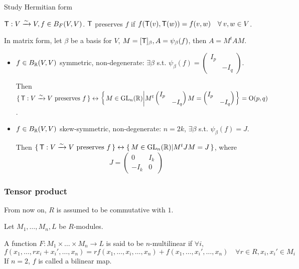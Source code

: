 \begin{exercise}
  Study Hermitian form
\end{exercise}

${\sf T}: V \xrightarrow{\sim} V, f\in B_F(V, V)$.
${\sf T}$ preserves $f$ if $f({\sf T}(v), {\sf T}(w)) = f(v, w) \quad
\forall v,w \in V$.

In matrix form, let $\beta$ be a basis for $V$,
$M =[{\sf T}]_\beta, A = \psi_\beta(f)$, then $A = M^tAM$.

\begin{itemize}
  \item $f \in B_{\mathbb{R}}(V,V)$ symmetric, non-degenerate:
    $\exists \beta$ s.t. $\psi_\beta(f) = \begin{pmatrix}I_p \\ & -I_q\end{pmatrix}$.

    Then $\{\, {\sf T}: V \xrightarrow{\sim} V \text{~preserves~} f \,\} \leftrightarrow
    \left\{\,
      M \in \text{GL}_n(\mathbb{R}) \middle|
      M^t\begin{pmatrix}I_p \\ & -I_q\end{pmatrix}M = \begin{pmatrix}I_p \\ & -I_q\end{pmatrix}
      \,\right\} = \text{O}(p, q)$.
  \item $f \in B_{\mathbb{R}}(V,V)$ skew-symmetric, non-degenerate: $n = 2k$,
    $\exists \beta$ s.t. $\psi_\beta(f) = J$.

    Then $\{\, {\sf T}: V \xrightarrow{\sim} V \text{~preserves~} f \,\} \leftrightarrow
    \left\{\,
      M \in \text{GL}_n(\mathbb{R}) \middle|
      M^tJM = J
      \,\right\}$, where 
    \[ J = \begin{pmatrix}
        0 & I_k \\
        -I_k & 0
    \end{pmatrix} \]
\end{itemize}

\subsubsection{Tensor product}
From now on, $R$ is assumed to be commutative with $1$.

\begin{definition}
Let $M_1, \dots, M_n, L$ be $R$-modules.

A function $F: M_1 \times \dots \times M_n \to L$ is said to be $n$-multilinear
if $\forall i$,
\[
  f(x_1, \dots, rx_i + x_i', \dots, x_n) =
  rf(x_1, \dots, x_i, \dots, x_n) + f(x_1, \dots, x_i', \dots, x_n)
  \quad \forall r \in R, x_i, x_i' \in M_i
\]
If $n = 2$, $f$ is called a bilinear map.
\end{definition}

